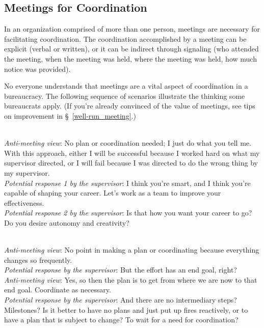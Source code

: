 \subsection{Meetings for Coordination\label{sec:meetings-for-coordination}}
In an organization comprised of more than one person, meetings are necessary for facilitating coordination. The coordination accomplished by a meeting can be explicit (verbal or written), or it can be indirect through signaling (who attended the meeting, when the meeting was held, where the meeting was held, how much notice was provided). 

No everyone understands that meetings are a vital aspect of coordination in a bureaucracy. The following sequence of scenarios illustrate the thinking some bureaucrats apply. (If you're already convinced of the value of meetings, see tips on improvement in \S~\ref{well-run_meeting}.)


\ \\

\textit{Anti-meeting view}: No plan or coordination needed; I just do what you tell me. With this approach, either I will be successful because I worked hard on what my supervisor directed, or I will fail because I was directed to do the wrong thing by my supervisor.\\
\textit{Potential response 1 by the supervisor}: I think you're smart, and I think you're capable of shaping your career. Let's work as a team to improve your effectiveness. \\
\textit{Potential response 2 by the supervisor}: Is that how you want your career to go? Do you desire autonomy and creativity?

\ \\

\textit{Anti-meeting view}: No point in making a plan or coordinating because everything changes so frequently. \\
\textit{Potential response by the supervisor}: But the effort has an end goal, right?\\
\textit{Anti-meeting view}:  Yes, so then the plan is to get from where we are now to that end goal. Coordinate as necessary. \\
\textit{Potential response by the supervisor}: And there are no intermediary steps? Milestones?
Is it better to have no plans and just put up fires reactively, or to have a plan that is subject to change? To wait for a need for coordination?

